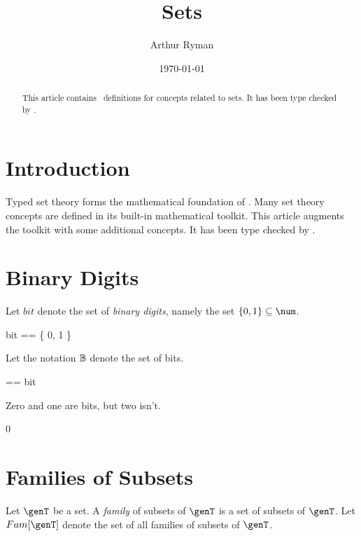 \documentclass{amsart}
\begin{document}
\title{Sets}
\author{Arthur Ryman}
\date{\today}

\begin{abstract}
This article contains \ZN\ definitions for 
concepts related to sets.
It has been type checked by \fuzz.
\end{abstract}

\maketitle

\tableofcontents

\section{Introduction}

Typed set theory forms the mathematical foundation of \ZN\cite{spivey-zrm}.
Many set theory concepts are defined in its built-in mathematical toolkit. 
This article augments the toolkit with some additional concepts.
It has been type checked by \fuzz\cite{spivey-fm}.

\section{Binary Digits}

Let $bit$ denote the set of \textit{binary digits}, namely the set $\{ 0, 1\} \subseteq \num$.

\begin{zed}
	bit == \{ 0, 1 \}
\end{zed}

Let the notation $\mathbb{B}$ denote the set of bits.

\begin{zed}
	\B == bit
\end{zed}

\begin{example}
Zero and one are bits, but two isn't.
\begin{zed}
	0 \in \B
{} \in \B
{} \notin \B
\end{zed}
\end{example}

\section{Families of Subsets}

Let $\genT$ be a set.
A \textit{family} of subsets of $\genT$ is a set of subsets of $\genT$.
Let $Fam[\genT]$ denote the set of all families of subsets of $\genT$.
\end{document}
